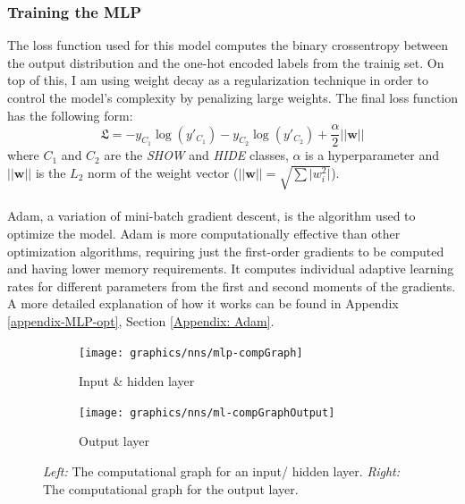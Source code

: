 	\subsubsection*{Training the MLP}
	The loss function used for this model computes the binary crossentropy between the output distribution and the one-hot encoded labels from the trainig set. On top of this, I am using weight decay as a regularization technique in order to control the model's complexity by penalizing large weights. The final loss function has the following form:
	\begin{equation}
		\mathfrak{L} = - y_{C_1}\log(y'_{C_1}) - y_{C_2}\log(y'_{C_2}) + \frac{\alpha}{2}\vert\vert\mathbf{w}\vert\vert 
		\label{Eq: impl/ml/loss}
	\end{equation}
	where $C_1$ and $C_2$ are the \textit{SHOW} and \textit{HIDE} classes, $\alpha$ is a hyperparameter and $\vert\vert\mathbf{w}\vert\vert$ is the $L_2$ norm of the weight vector ($\vert\vert\mathbf{w}\vert\vert = \sqrt{\sum \vert w_i^2 \vert}$).
	\\ \\
	Adam\cite{DBLP:journals/corr/KingmaB14}, a variation of mini-batch gradient descent, is the algorithm used to optimize the model. Adam is more computationally effective than other optimization algorithms, requiring just the first-order gradients to be computed and having lower memory requirements. It computes individual adaptive learning rates for different parameters from the first and second moments of the gradients. A more detailed explanation of how it works can be found in Appendix \ref{appendix-MLP-opt}, Section \ref{Appendix: Adam}.

	\begin{figure}[H]
		\centering
		\begin{subfigure}[b]{.4\textwidth}
			\texttt{[image: graphics/nns/mlp-compGraph]}
			\caption{Input \& hidden layer}
			\label{Fig: impl/ml/mlp/compgraph-hidden}
		\end{subfigure}
		\hfill
		\begin{subfigure}[b]{.4\textwidth}
			\texttt{[image: graphics/nns/ml-compGraphOutput]}
			\caption{Output layer}
			\label{Fig: impl/ml/mlp/compgraph-output}
	\end{subfigure}
	\caption[Computational graphs for MLP layers]{\textit{Left:} The computational graph for an input/ hidden layer. \textit{Right:} The computational graph for the output layer.}
	\label{Fig: impl/ml/mlp/compgraph}
	\end{figure}
	
